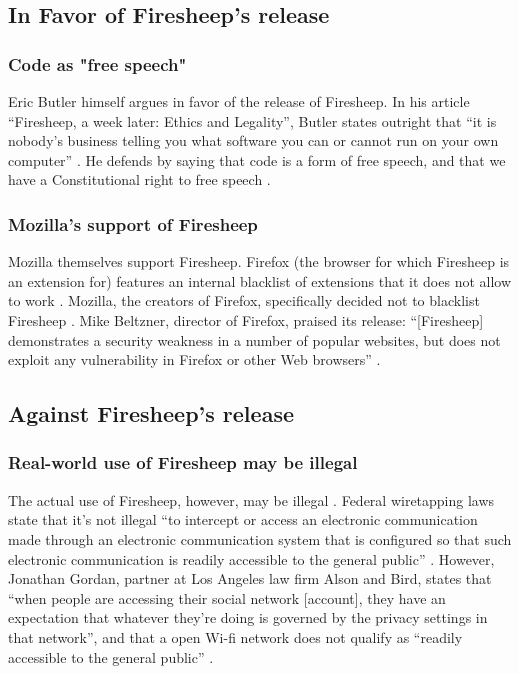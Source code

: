 \documentclass[11pt]{article}
\begin{document}
\begin{multicols}{2}
\subsection{In Favor of Firesheep's release}
\subsubsection{Code as "free speech"}
Eric Butler himself argues in favor of the release of Firesheep. In his article ``Firesheep, a week later: Ethics and Legality'', Butler states outright that ``it is nobody's business telling you what software you can or cannot run on your own computer'' \cite{butler-week-later}. He defends by saying that code is a form of free speech, and that we have a Constitutional right to free speech \cite{butler-week-later}.

\subsubsection{Mozilla's support of Firesheep}
Mozilla themselves support Firesheep. Firefox (the browser for which Firesheep is an extension for) features an internal blacklist of extensions that it does not allow to work \cite{mozilla-blocklist}. Mozilla, the creators of Firefox, specifically decided not to blacklist Firesheep \cite{no-kill-switch}. Mike Beltzner, director of Firefox, praised its release: ``[Firesheep] demonstrates a security weakness in a number of popular websites, but does not exploit any vulnerability in Firefox or other Web browsers'' \cite{no-kill-switch}.


\subsection{Against Firesheep's release}
\subsubsection{Real-world use of Firesheep may be illegal}
The actual use of Firesheep, however, may be illegal \cite{illegal-to-use-firesheep}. Federal wiretapping laws state that it's not illegal ``to intercept or access an electronic communication made through an electronic communication system that is configured so that such electronic communication is readily accessible to the general public'' \cite{illegal-to-use-firesheep}. However, Jonathan Gordan, partner at Los Angeles law firm Alson and Bird, states that ``when people are accessing their social network [account], they have an expectation that whatever they're doing is governed by the privacy settings in that network'', and that a open Wi-fi network does not qualify as ``readily accessible to the general public'' \cite{illegal-to-use-firesheep}.


\end{multicols}
\end{document}
